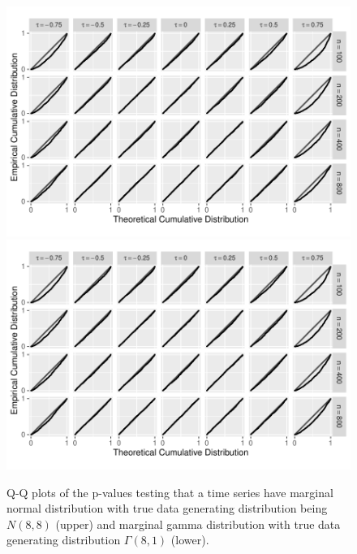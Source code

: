 \documentclass[APA,Times1COL]{WileyNJDv5} %
\begin{document}
\begin{figure}[tbp]
  \centering
  \includegraphics[width = .9\textwidth]{figures/normal}
  \includegraphics[width = .9\textwidth]{figures/gamma}
  \caption{Q-Q plots of the p-values testing that a time series
    have marginal normal distribution with true data generating distribution
    being $N(8,8)$ (upper) and marginal gamma distribution with true data
    generating distribution $\Gamma(8,1)$ (lower).}
  \label{fig:qq}
\end{figure}
\end{document}
